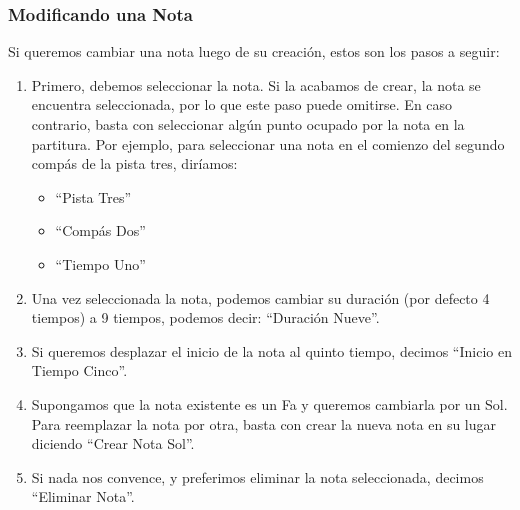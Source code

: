 \subsubsection{Modificando una Nota}

Si queremos cambiar una nota luego de su creaci\'on, estos son los pasos a seguir:

\begin{enumerate}
\item Primero, debemos seleccionar la nota. Si la acabamos de crear, la nota se 
    encuentra seleccionada, por lo que este paso puede omitirse.
    En caso contrario, basta con seleccionar alg\'un punto ocupado por la nota en la partitura.
    Por ejemplo, para seleccionar una nota en el comienzo del segundo comp\'as de la pista tres,  dir\'iamos:
    \begin{itemize}
        \item ``Pista Tres''
        \item ``Comp\'as Dos''
        \item ``Tiempo Uno''
     \end{itemize}
\item Una vez seleccionada la nota, podemos cambiar su duraci\'on (por defecto 4 tiempos) a 9 tiempos, podemos decir: 
     ``Duraci\'on Nueve''.
\item Si queremos desplazar el inicio de la nota al quinto tiempo, decimos ``Inicio en Tiempo Cinco''.
\item Supongamos que la nota existente es un Fa y queremos cambiarla por un Sol. Para reemplazar la 
     nota por otra, basta con crear la nueva nota en su lugar diciendo ``Crear Nota Sol''.
\item Si nada nos convence, y preferimos eliminar la nota seleccionada, decimos ``Eliminar Nota''.
\end{enumerate}
